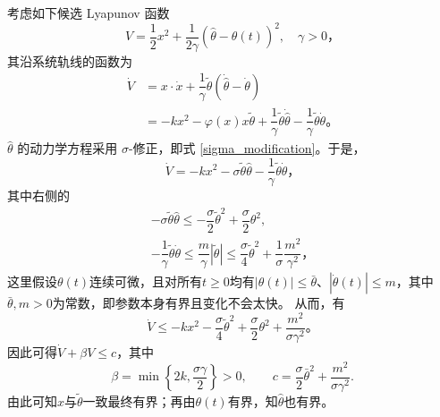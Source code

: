 考虑如下候选 Lyapunov 函数
\[
    V = \dfrac{1}{2} x^2 + \dfrac{1}{2 \gamma} {\left( \hat{\theta} - \theta(t) \right)}^2, \quad \gamma > 0 \text{，}
\]
其沿系统轨线的函数为
\begin{align*}
    \dot{V} &= x \cdot \dot{x} + \dfrac{1}{\gamma} \tilde{\theta} \left( \dot{\hat{\theta}} - \dot{\theta} \right) \\
    &= -k x^2 - \varphi(x) x \tilde{\theta} + \dfrac{1}{\gamma} \tilde{\theta} \dot{\hat{\theta}} - \dfrac{1}{\gamma} \tilde{\theta} \dot{\theta} \text{。}
\end{align*}
$\hat{\theta}$ 的动力学方程采用 $\sigma$-修正，即式 \eqref{sigma_modification}。于是，
\[
    \dot{V} = -k x^2 - \sigma \tilde{\theta} \hat{\theta} - \dfrac{1}{\gamma} \tilde{\theta} \dot{\theta} \text{，}
\]
其中右侧的
\begin{gather*}
    -\sigma \tilde{\theta} \hat{\theta} \leq -\dfrac{\sigma}{2} {\tilde{\theta}}^2 + \dfrac{\sigma}{2} {\theta}^2, \\
    -\dfrac{1}{\gamma} \tilde{\theta} \dot{\theta} \leq \dfrac{m}{\gamma} |\tilde{\theta}| \leq \dfrac{\sigma}{4} \tilde{\theta}^2 + \dfrac{1}{\sigma} \dfrac{m^2}{\gamma^2} \text{，}
\end{gather*}
这里假设$\theta(t)$连续可微，且对所有$t\ge0$均有$|\theta(t)|\le\bar\theta$、$|\dot\theta(t)|\le m$，其中$\bar\theta,m>0$为常数，即参数本身有界且变化不会太快。
从而，有
\[
    \dot{V} \leq -k x^2 - \dfrac{\sigma}{4} {\tilde{\theta}}^2 + \dfrac{\sigma}{2} \theta^2 + \dfrac{m^2}{\sigma \gamma^2} \text{。}
\]
因此可得$\dot V+\beta V\le c$，其中
\[
    \beta=\min\left\{2k,\frac{\sigma\gamma}{2}\right\}>0,\qquad
    c=\frac{\sigma}{2}\bar\theta^2+\frac{m^2}{\sigma\gamma^2}.
\]
由此可知$x$与$\tilde\theta$一致最终有界；再由$\theta(t)$有界，知$\hat\theta$也有界。

